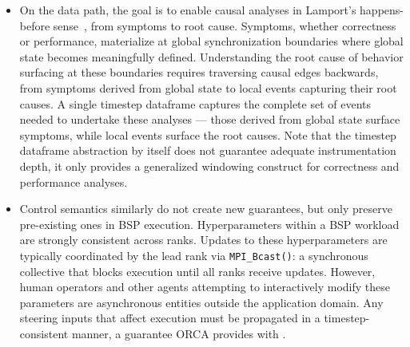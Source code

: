 \begin{itemize}[leftmargin=*]
  \item On the data path, the goal is to enable causal analyses in Lamport's happens-before
        sense~\cite{Lampo1978:TimeClocksOrdering},
        from symptoms to root cause.
        Symptoms, whether correctness or performance, materialize at global synchronization boundaries
        where global state becomes meaningfully defined.
        Understanding the root cause of behavior surfacing at these boundaries requires traversing causal
        edges backwards, from symptoms derived from global state to local events capturing their root
        causes.
        A single timestep dataframe captures
        the complete set of events needed to undertake these analyses ---
        those derived from global state surface symptoms, while local events surface the root causes.
        Note that the timestep dataframe abstraction by itself does not guarantee adequate instrumentation
        depth,
        it only provides a generalized windowing construct for correctness and performance analyses.

  \item Control semantics similarly do not create new guarantees, but only preserve pre-existing ones
        in BSP execution.
        Hyperparameters within a BSP workload are strongly consistent across ranks.
        Updates to these hyperparameters are typically coordinated by the lead rank
        via \texttt{MPI\_Bcast()}: a synchronous collective that blocks execution until all ranks receive
        updates.
        However, human operators and other agents attempting to interactively modify these parameters are
        asynchronous entities outside the application domain.
        Any steering inputs that affect execution must be propagated in a
        timestep-consistent manner, a guarantee ORCA provides with \twopc{}.

\end{itemize}





